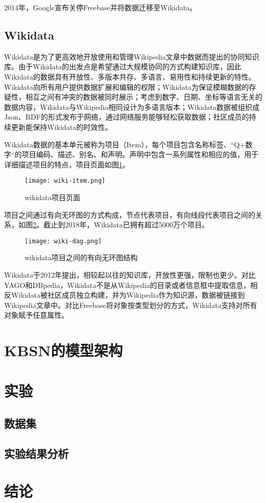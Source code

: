 2014年，Google宣布关停Freebase并将数据迁移至Wikidata。

\subsection{Wikidata}
Wikidata是为了更高效地开放使用和管理Wikipedia文章中数据而提出的协同知识库。由于Wikidata的出发点是希望通过大规模协同的方式构建知识库，因此Wikidata的数据具有开放性、多版本共存、多语言、易用性和持续更新的特性。Wikidata向所有用户提供数据扩展和编辑的权限；Wikidata为保证模糊数据的存疑性，相互之间有冲突的数据被同时展示；考虑到数字、日期、坐标等语言无关的数据内容，Wikidata与Wikipedia相同设计为多语言版本；Wikidata数据被组织成Json、RDF的形式发布于网络，通过网络服务能够轻松获取数据；社区成员的持续更新能保持Wikidata的时效性。

Wikidata数据的基本单元被称为项目（Item），每个项目包含名称标签、“Q+数字“的项目编码、描述、别名、和声明。声明中包含一系列属性和相应的值，用于详细描述项目的特点，项目页面如图\ref{wiki-item}。
\begin{figure}[H]
	\centering
	\texttt{[image: wiki-item.png]}
	\caption{wikidata项目页面}
	\label{wiki-item}
\end{figure}
项目之间通过有向无环图的方式构成，节点代表项目，有向线段代表项目之间的关系，如图\ref{wiki-dag}。截止到2018年，Wikidata已拥有超过5000万个项目。
\begin{figure}[H]
	\centering
	\texttt{[image: wiki-dag.png]}
	\caption{wikidata项目之间的有向无环图结构}
	\label{wiki-dag}
\end{figure}

Wikidata于2012年提出，相较起以往的知识库，开放性更强，限制也更少。对比YAGO和DBpedia，Wikidata不是从Wikipedia的目录或者信息框中提取信息，相反Wikidata被社区成员独立构建，并为Wikipedia作为知识源，数据被链接到Wikipedia文章中。对比Freebase将对象按类型划分的方式，Wikidata支持对所有对象赋予任意属性。

\section{KBSN的模型架构}

\section{实验}
\subsection{数据集}
\subsection{实验结果分析}

\section{结论}
